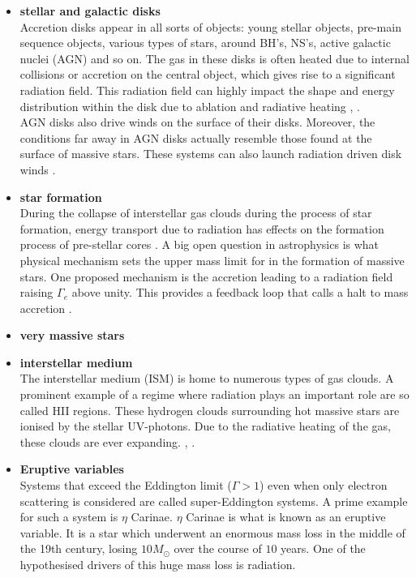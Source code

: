 \begin{itemize}
\item \textbf{stellar and galactic disks}\\
Accretion disks appear in all sorts of objects: young stellar objects, pre-main sequence objects, various types of stars, around BH's, NS's, active galactic nuclei (AGN) \citep{Proga2009} and so on. The gas in these disks is often heated due to internal collisions or accretion on the central object, which gives rise to a significant radiation field. This radiation field can highly impact the shape and energy distribution within the disk due to ablation and radiative heating \citep{Kee2018}, \citep{Nakatani2017}. \\
AGN disks also drive winds on the surface of their disks. Moreover, the conditions far away in AGN disks actually resemble those found at the surface of massive stars. These systems can also launch radiation driven disk winds \citep{Proga2009}.

\item \textbf{star formation}\\
During the collapse of interstellar gas clouds during the process of star formation, energy transport due to radiation has effects on the formation process of pre-stellar cores \citep{Bhandare2017}. A big open question in astrophysics is what physical mechanism sets the upper mass limit for in the formation of massive stars. One proposed mechanism is the accretion leading to a radiation field raising $\Gamma_e$ above unity. This provides a feedback loop that calls a halt to mass accretion \cite{Vink2018}.

\item \textbf{very massive stars}\\

\item \textbf{interstellar medium}\\
The interstellar medium (ISM) is home to numerous types of gas clouds. A prominent example of a regime where radiation plays an important role are so called HII regions. These hydrogen clouds surrounding hot massive stars are ionised by the stellar UV-photons. Due to the radiative heating of the gas, these clouds are ever expanding. \citep{ISM course notes}, \citep{Klaassen2017}. 

\item \textbf{Eruptive variables}\\
Systems that exceed the Eddington limit ($\Gamma > 1$) even when only electron scattering is considered are called super-Eddington systems. A prime example for such a system is $\eta$ Carinae. $\eta$ Carinae is what is known as an eruptive variable. It is a star which underwent an enormous mass loss in the middle of the 19th century, losing $10 M_\odot$ over the course of $10$ years. One of the hypothesised drivers of this huge mass loss is radiation.
\end{itemize}

